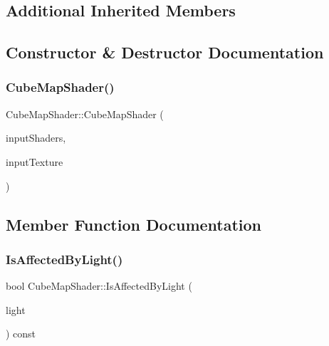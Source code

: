 \subsection*{Additional Inherited Members}


\subsection{Constructor \& Destructor Documentation}
\hypertarget{class_cube_map_shader_abfd5fb870087965ef8d37323f7f9ed3a}{}\label{class_cube_map_shader_abfd5fb870087965ef8d37323f7f9ed3a}
\subsubsection{\texorpdfstring{Cube\+Map\+Shader()}{CubeMapShader()}}
{\footnotesize\ttfamily Cube\+Map\+Shader\+::\+Cube\+Map\+Shader (\begin{DoxyParamCaption}\item[{const std\+::unordered\+\_\+map$<$ G\+Lenum, std\+::string $>$ \&}]{input\+Shaders,  }\item[{std\+::shared\+\_\+ptr$<$ class \hyperlink{class_cube_map_texture}{Cube\+Map\+Texture} $>$}]{input\+Texture }\end{DoxyParamCaption})}



\subsection{Member Function Documentation}
\hypertarget{class_cube_map_shader_aa0c9e535cb18663acd9857165abc788f}{}\label{class_cube_map_shader_aa0c9e535cb18663acd9857165abc788f}
\subsubsection{\texorpdfstring{Is\+Affected\+By\+Light()}{IsAffectedByLight()}}
{\footnotesize\ttfamily bool Cube\+Map\+Shader\+::\+Is\+Affected\+By\+Light (\begin{DoxyParamCaption}\item[{const class \hyperlink{class_light}{Light} $\ast$}]{light }\end{DoxyParamCaption}) const\hspace{0.3cm}{\ttfamily [virtual]}}



